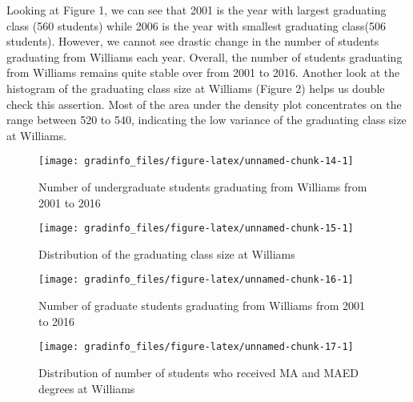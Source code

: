 Looking at Figure 1, we can see that 2001 is the year with largest
graduating class (560 students) while 2006 is the year with smallest
graduating class(506 students). However, we cannot see drastic change in
the number of students graduating from Williams each year. Overall, the
number of students graduating from Williams remains quite stable over
from 2001 to 2016. Another look at the histogram of the graduating class
size at Williams (Figure 2) helps us double check this assertion. Most
of the area under the density plot concentrates on the range between 520
to 540, indicating the low variance of the graduating class size at
Williams.

\begin{Schunk}
\begin{figure}

{\centering \texttt{[image: gradinfo\_files/figure-latex/unnamed-chunk-14-1]} 

}

\caption[Number of undergraduate students graduating from Williams from 2001 to 2016]{Number of undergraduate students graduating from Williams from 2001 to 2016}\label{fig:unnamed-chunk-14}
\end{figure}
\end{Schunk}\begin{Schunk}
\begin{figure}

{\centering \texttt{[image: gradinfo\_files/figure-latex/unnamed-chunk-15-1]} 

}

\caption[Distribution of the graduating class size at Williams]{Distribution of the graduating class size at Williams}\label{fig:unnamed-chunk-15}
\end{figure}
\end{Schunk}\begin{Schunk}
\begin{figure}

{\centering \texttt{[image: gradinfo\_files/figure-latex/unnamed-chunk-16-1]} 

}

\caption[Number of graduate students graduating from Williams from 2001 to 2016]{Number of graduate students graduating from Williams from 2001 to 2016}\label{fig:unnamed-chunk-16}
\end{figure}
\end{Schunk}\begin{Schunk}
\begin{figure}

{\centering \texttt{[image: gradinfo\_files/figure-latex/unnamed-chunk-17-1]} 

}

\caption[Distribution of number of students who received MA and MAED degrees at Williams]{Distribution of number of students who received MA and MAED degrees at Williams}\label{fig:unnamed-chunk-17}
\end{figure}
\end{Schunk}

